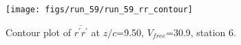 \begin{figure}[H]
\centering
\texttt{[image: figs/run\_59/run\_59\_rr\_contour]}
\caption{Contour plot of $\overline{r^\prime r^\prime}$ at $z/c$=9.50, $V_{free}$=30.9, station 6.}
\label{fig:run_59_rr_contour}
\end{figure}


